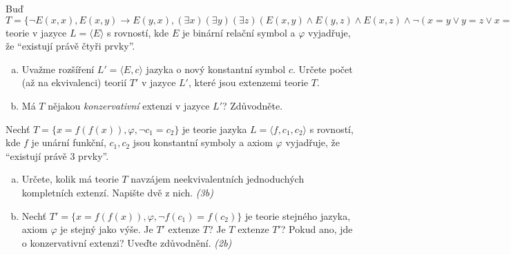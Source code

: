 \begin{problem}

    Buď $T=\{\neg E(x,x), E(x,y)\to E(y,x), (\exists x)(\exists y)(\exists z)(E(x,y)\wedge E(y,z)\wedge E(x,z)\wedge \neg(x=y\vee y=z\vee x=z)),\varphi\}$ teorie v jazyce $L=\langle E\rangle$ s rovností, kde $E$ je binární relační symbol a $\varphi$ vyjadřuje, že ``existují právě čtyři prvky''.
    \begin{enumerate}[(a)]
        \item Uvažme rozšíření $L'=\langle E,c\rangle$ jazyka o nový konstantní symbol $c$. Určete počet (až na ekvivalenci) teorií $T'$ v jazyce $L'$, které jsou extenzemi teorie $T$. 
        \item Má $T$ nějakou \emph{konzervativní} extenzi v jazyce $L'$? Zdůvodněte.
    \end{enumerate}

\end{problem}


\begin{problem}

    Nechť $T=\{x=f(f(x)),\varphi, \neg c_1 = c_2\}$ je teorie jazyka $L=\langle f,c_1,c_2\rangle$ s rovností, kde $f$ je unární funkční, $c_1,c_2$ jsou konstantní symboly a axiom $\varphi$ vyjadřuje, že ``existují právě $3$ prvky''.
    \begin{enumerate}[(a)]    
        \item Určete, kolik má teorie $T$ navzájem neekvivalentních jednoduchých kompletních extenzí. Napište dvě z nich. {\it (3b)}
        \item Nechť $T'=\{x=f(f(x)),\varphi,\neg f(c_1)=f(c_2)\}$ je teorie stejného jazyka, axiom $\varphi$ je stejný jako výše. Je $T'$ extenze $T$? Je $T$ extenze $T'$? Pokud ano, jde o konzervativní extenzi? Uveďte zdůvodnění. {\it (2b)}
    \end{enumerate}
    
\end{problem}


